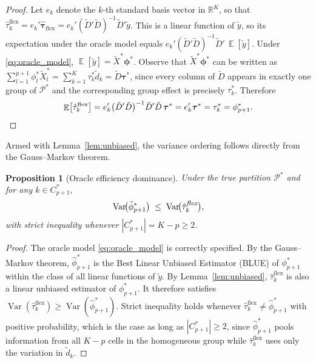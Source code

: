 \documentclass[margin=3in, 12pt]{article}
\newtheorem{proposition}{Proposition}
\DeclareMathOperator{\E}{\mathbb{E}}
\DeclareMathOperator{\Var}{Var}
\newcommand{\1}{\mathbbm{1}}
\newcommand{\ytd}{\tilde{y}}
\newcommand{\Dtd}{\tilde{D}}
\newcommand{\Xtd}{\tilde{X}}
\begin{document}
\begin{proof}
Let $e_k$ denote the $k$-th standard basis vector in $\mathbb{R}^K$, so
that $\hat\tau_k^{\text{flex}} = e_k'\hat{\bm{\tau}}_{\text{flex}} =
e_k'(\Dtd'\Dtd)^{-1}\Dtd'\ytd$.
This is a linear function of $\ytd$, so its expectation under the oracle
model equals $e_k'(\Dtd'\Dtd)^{-1}\Dtd'\,\E[\ytd]$.
Under \eqref{eq:oracle_model}, $\E[\ytd] = \Xtd^*\bm{\phi}^*$.
Observe that $\Xtd^*\bm{\phi}^*$ can be written as
$\sum_{l=1}^{p+1}\phi_l^* \Xtd_l^* = \sum_{k=1}^K \tau_k^* \tilde{d}_k =
\Dtd\bm{\tau}^*$, since every column of $\Dtd$ appears in exactly one
group of $\mathcal{P}^*$ and the corresponding group effect is precisely
$\tau_k^*$.  Therefore
\[
  \E\bigl[\hat\tau_k^{\text{flex}}\bigr]
  = e_k'\bigl(\Dtd'\Dtd\bigr)^{-1}\Dtd'\Dtd\,\bm{\tau}^*
  = e_k'\bm{\tau}^* = \tau_k^* = \phi_{p+1}^*. \qedhere
\]
\end{proof}

\noindent Armed with Lemma~\ref{lem:unbiased}, the variance ordering follows
directly from the Gauss--Markov theorem.

\begin{proposition}[Oracle efficiency dominance]
  \label{prop:oracle_dom}
  Under the true partition $\mathcal{P}^*$ and for any $k \in C_{p+1}^*$,
  \begin{equation}
    \Var\!\bigl(\hat\phi_{p+1}^*\bigr)
    \;\leq\;
    \Var\!\bigl(\hat\tau_k^{\emph{flex}}\bigr),
    \label{eq:var_ineq}
  \end{equation}
  with strict inequality whenever $|C_{p+1}^*| = K - p \geq 2$.
\end{proposition}

\begin{proof}
The oracle model \eqref{eq:oracle_model} is correctly specified.
By the Gauss--Markov theorem, $\hat\phi_{p+1}^*$ is the Best Linear
Unbiased Estimator (BLUE) of $\phi_{p+1}^*$ within the class of all
linear functions of $\ytd$.
By Lemma~\ref{lem:unbiased}, $\hat\tau_k^{\text{flex}}$ is also a linear
unbiased estimator of $\phi_{p+1}^*$.
It therefore satisfies $\Var(\hat\tau_k^{\text{flex}}) \geq
\Var(\hat\phi_{p+1}^*)$.
Strict inequality holds whenever $\hat\tau_k^{\text{flex}} \neq
\hat\phi_{p+1}^*$ with positive probability, which is the case as long as
$|C_{p+1}^*| \geq 2$, since $\hat\phi_{p+1}^*$ pools information from all
$K-p$ cells in the homogeneous group while $\hat\tau_k^{\text{flex}}$
uses only the variation in $\tilde{d}_k$.
\end{proof}
\end{document}
